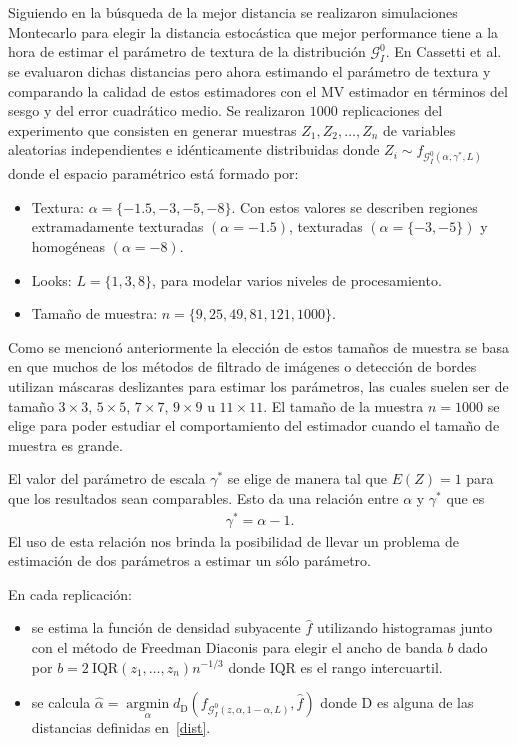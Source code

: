 Siguiendo en la búsqueda de la mejor distancia se realizaron simulaciones Montecarlo para elegir la distancia estocástica que mejor performance tiene a la hora de estimar el parámetro de textura de la distribución $\mathcal{G}_I^0$. En Cassetti et al.~\cite{cassettiast2013} se evaluaron dichas distancias pero ahora estimando el parámetro de textura y  comparando la calidad de estos estimadores con el MV estimador en términos del sesgo y del error cuadrático medio. Se realizaron $1000$ replicaciones del experimento que consisten en generar muestras $Z_1, Z_2,\ldots,Z_n$ de variables aleatorias independientes e idénticamente distribuidas donde $Z_i \sim f_{\mathcal{G}_I^0(\alpha,\gamma^*,L)}$ donde el espacio paramétrico está formado por:

\begin{itemize}
	\item Textura: $\alpha=\{-1.5, -3, -5, -8\}$. Con estos valores se describen regiones extramadamente texturadas $(\alpha=-1.5)$, texturadas $(\alpha=\{-3,-5\})$ y homogéneas $(\alpha=-8)$. 
	\item Looks: $L=\{1,3,8\}$, para modelar varios niveles de procesamiento.
	\item Tamaño de muestra: $n=\{9, 25,49, 81,121,1000\}$. 
\end{itemize}

Como se mencionó anteriormente la elección de estos tamaños de muestra se basa en que muchos de los métodos de filtrado de imágenes o detección de bordes utilizan máscaras deslizantes para estimar los parámetros, las cuales suelen ser de tamaño $3 \times 3$,  $5 \times 5$, $7 \times 7$, $9 \times 9$ u  $11 \times 11$. El tamaño de la muestra $n=1000$ se elige para poder estudiar el comportamiento del estimador cuando el tamaño de muestra es grande. 

El valor del parámetro de escala $\gamma^*$ se elige de manera tal que $E(Z)=1$ para que los resultados sean comparables. Esto da una relación entre  $\alpha$ y $\gamma^*$ que es 
\begin{align}
\label{Gama*}
\gamma^*=\alpha-1.
\end{align}
El uso de esta relación nos brinda la posibilidad de llevar un problema de estimación de dos parámetros a estimar un sólo parámetro. 


En cada replicación:
\begin{itemize}
	\item se estima la función de densidad subyacente $\widehat{f}$ utilizando histogramas junto con el método de Freedman Diaconis para elegir el ancho de banda $b$ dado por $b=2 \ \text{IQR}(z_1,\ldots,z_n) n^{-1/3}$ donde $\text{IQR}$ es el rango intercuartil.
	\item se calcula $\widehat{\alpha}= \mathop{\text{argmin}}\limits_{\alpha}d_{\text{D}}(f_{\mathcal{G}_I^0(z,\alpha,1-\alpha,L)},\widehat{f})$ donde D es alguna de las distancias definidas en~\ref{dist}.
\end{itemize} 

